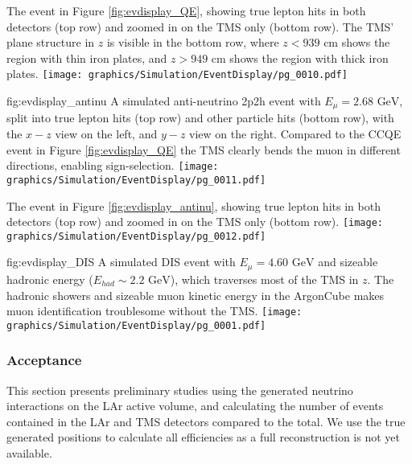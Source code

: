 \begin{dunefigure}[]{}
{The event in Figure \ref{fig:evdisplay_QE}, showing true lepton hits in both detectors (top row) and zoomed in on the TMS only (bottom row). The TMS' plane structure in $z$ is visible in the bottom row, where $z<939\text{ cm}$ shows the region with thin iron plates, and $z>949\text{ cm}$ shows the region with thick iron plates.}
\texttt{[image: graphics/Simulation/EventDisplay/pg\_0010.pdf]}
\end{dunefigure}

\begin{dunefigure}{fig:evdisplay_antinu}
{A simulated anti-neutrino 2p2h event with $E_\mu=2.68\text{ GeV}$, split into true lepton hits (top row) and other particle hits (bottom row), with the $x-z$ view on the left, and $y-z$ view on the right. Compared to the CCQE event in Figure \ref{fig:evdisplay_QE} the TMS clearly bends the muon in different directions, enabling sign-selection.}
\texttt{[image: graphics/Simulation/EventDisplay/pg\_0011.pdf]}
\end{dunefigure}

\begin{dunefigure}[]{}
{The event in Figure \ref{fig:evdisplay_antinu}, showing true lepton hits in both detectors (top row) and zoomed in on the TMS only (bottom row).}
\texttt{[image: graphics/Simulation/EventDisplay/pg\_0012.pdf]}
\end{dunefigure}

\begin{dunefigure}[]{fig:evdisplay_DIS}
{A simulated DIS event with $E_\mu=4.60\text{ GeV}$ and sizeable hadronic energy ($E_{had}\sim2.2\text{ GeV}$), which traverses most of the TMS in $z$. The hadronic showers and sizeable muon kinetic energy in the ArgonCube makes muon identification troublesome without the TMS.}
\texttt{[image: graphics/Simulation/EventDisplay/pg\_0001.pdf]}
\end{dunefigure}

\clearpage

\subsubsection{Acceptance}
This section presents preliminary studies using the generated neutrino interactions on the LAr active volume, and calculating the number of events contained in the LAr and TMS detectors compared to the total. We use the true generated positions to calculate all efficiencies as a full reconstruction is not yet available.

